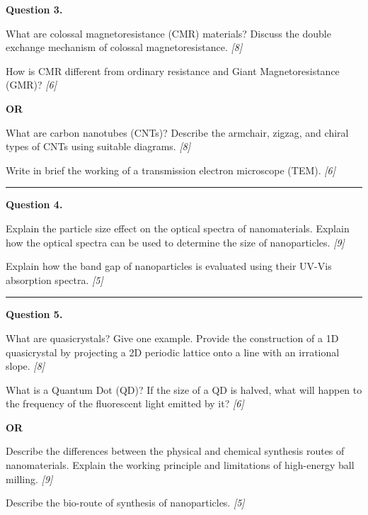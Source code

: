 \documentclass[11pt,a4paper]{article}
\newcommand{\pts}[1]{\hfill   \textit{[#1]}}
\begin{document}
\noindent   \textbf{Question 3.}

\begin{parts}
  \item What are colossal magnetoresistance (CMR) materials? Discuss the double exchange mechanism of colossal magnetoresistance. \pts{8}
  \item How is CMR different from ordinary resistance and Giant Magnetoresistance (GMR)? \pts{6}
\end{parts}
\hfill   \textbf{OR}

\begin{parts}
  \item What are carbon nanotubes (CNTs)? Describe the armchair, zigzag, and chiral types of CNTs using suitable diagrams. \pts{8}
  \item Write in brief the working of a transmission electron microscope (TEM). \pts{6}
\end{parts}

\medskip\rule{\linewidth}{0.2pt}




\noindent   \textbf{Question 4.}

\begin{parts}
  \item Explain the particle size effect on the optical spectra of nanomaterials. Explain how the optical spectra can be used to determine the size of nanoparticles. \pts{9}
  \item Explain how the band gap of nanoparticles is evaluated using their UV-Vis absorption spectra. \pts{5}
\end{parts}

\medskip\rule{\linewidth}{0.2pt}




\noindent   \textbf{Question 5.}

\begin{parts}
  \item What are quasicrystals? Give one example. Provide the construction of a 1D quasicrystal by projecting a 2D periodic lattice onto a line with an irrational slope. \pts{8}
  \item What is a Quantum Dot (QD)? If the size of a QD is halved, what will happen to the frequency of the fluorescent light emitted by it? \pts{6}
\end{parts}
\hfill   \textbf{OR}

\begin{parts}
  \item Describe the differences between the physical and chemical synthesis routes of nanomaterials. Explain the working principle and limitations of high-energy ball milling. \pts{9}
  \item Describe the bio-route of synthesis of nanoparticles. \pts{5}
\end{parts}
\end{document}
